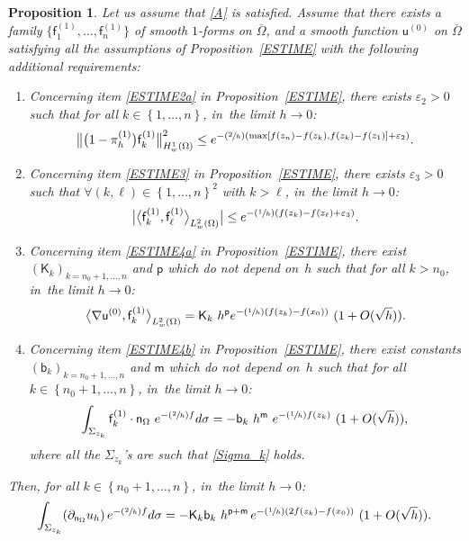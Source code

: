 \documentclass[10pt]{amsart}
\newcommand{\Psfrac}[2]{(\sfrac{#1}{#2})}
\let\lp\langle
\let\rp\rangle
\let\ve\varepsilon
\theoremstyle{plain}
\newtheorem{proposition}{Proposition}
\theoremstyle{definition}
\begin{document}
\begin{proposition} \label{ESTIME2}
Let us assume that \ref{A} is satisfied. Assume that there exists a family $\{\mathsf f_1^{(1)}, \ldots,
\mathsf f_n^{(1)}\} $ of smooth $1$-forms on $\overline \Omega$, and
a smooth function $\mathsf u^{(0)}$ on $\overline \Omega$ satisfying
all the assumptions of Proposition~\ref{ESTIME} with the following
additional requirements:
\begin{enumerate}
\item\label{ESTIME21}
Concerning item \eqref{ESTIME2a} in Proposition~\ref{ESTIME}, there exists $\ve_2>0$ such that for all $ k\in \left\{1,\ldots,n\right\}$, in~the limit $h\to 0$:
\begin{equation}\label{eq:assump_2a_psi-estime2}
\big \| \bigl(1-\pi_h^{(1)}\bigr) \mathsf f_k^{(1)} \big \|_{H^1_w(\Omega)}^2 \le e^{-\Psfrac{2}{h}(\max[f(z_n)-f(z_k), f(z_k)-f(z_1)] +\ve_2)}.
\end{equation}
\item\label{ESTIME22}
Concerning item \eqref{ESTIME3} in Proposition~\ref{ESTIME},
there exists $\ve_3>0$ such that $\forall (k,\ell)
\in \left\{1,\ldots,n\right\}^2$ with $k>\ell$, in~the limit $h\to 0$:
\[
\big\vert \big\lp\mathsf f_k^{(1)}, \mathsf f_\ell^{(1)}\big\rp_{L^2_w(\Omega)}\big\vert \le e^{-\Psfrac{1}{h}(f(z_k)- f(z_\ell)+\varepsilon_3)}.
\]

\item\label{ESTIME23}
Concerning item \eqref{ESTIME4a} in Proposition~\ref{ESTIME}, there exist $(\mathsf K_k)_{k=n_0+1,\ldots,n}$ and $\mathsf p$ which do not depend on~$h$ such that for all $k>n_0$, in~the limit $h\to 0$:
\begin{equation*}
\big \lp \nabla\mathsf u^{(0)}, \mathsf f_k^{(1)}\big\rp_{L^2_w(\Omega)} = \mathsf K_k\ h^{\mathsf p} e^{-\Psfrac{1}{h}(f(z_k)- f(x_0))} \ (1 + O(\sqrt h)).
\end{equation*}

\item\label{ESTIME24}
Concerning item \eqref{ESTIME4b} in Proposition~\ref{ESTIME}, there exist
constants $(\mathsf b_k)_{k=n_0+1,\ldots,n}$ and $\mathsf m$ which do not depend on~$h$ such that for all $k
\in \left\{n_0+1,\ldots,n\right\}$, in~the limit $h\to 0$:
\begin{equation*}
\int_{\Sigma_{z_k}} \mathsf f_k^{(1)} \cdot \mathsf n_\Omega \ e^{-\Psfrac{2}{h} f} d\sigma =- \mathsf b_k \ h^{\mathsf m } \ e^{-\Psfrac{1}{h} f(z_k)} \ (1 + O(\sqrt h)),
\end{equation*}
where all the $\Sigma_{z_k}$'s are such that \eqref{Sigma_k} holds.
\end{enumerate}

Then, for all $k\in \left\{ n_0+1,\ldots,n\right\}$, in~the limit $h\to 0$:
\begin{equation*}
\int_{\Sigma_{z_k}} (\partial_{\mathsf n_\Omega} u_h)\, e^{-\Psfrac{2}{h}f} d\sigma = -\mathsf K_k \mathsf b_k \ h^{\mathsf p+\mathsf m} \, e^{-\Psfrac{1}{h}(2f(z_k)- f(x_0))} \ (1+ O(\sqrt h)).
\end{equation*}
\end{proposition}
\end{document}
